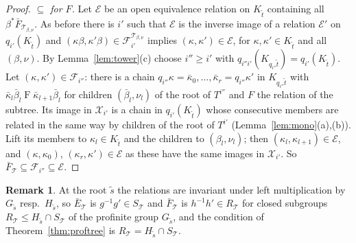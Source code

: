 \documentclass[11pt]{amsart}
\theoremstyle{definition}
\newtheorem{rem}[thm]{Remark}
\newcommand{\cX}{\mathcal X}
\begin{document}
\begin{proof}
\emph{$\subseteq$ for $F$.} Let $\mathcal E$ be an open equivalence
relation on $K_{\tilde t}$ containing all $\beta^*\bar F_{\mathcal T_{\beta,\nu}}$. As before there is $i'$ such that $\mathcal E$ is the
inverse image of a relation $\mathcal E'$ on $q_{i'}(K_{\tilde t})$
and $(\kappa\beta,\kappa'\beta)\in\mathcal F^{\mathcal T_{\beta,\nu}}_{i'}$
implies $(\kappa,\kappa')\in\mathcal E$, for $\kappa,\kappa'\in
K_{\tilde t}$ and all $(\beta,\nu)$. By Lemma~\ref{lem:tower}(c) choose
$i''\ge i'$ with $q_{i''i'}(K_{q_{i''}\tilde t})=q_{i'}(K_{\tilde
t})$. Let $(\kappa,\kappa')\in\mathcal F_{i''}$: there is a chain
$q_{i''}\kappa=\bar\kappa_0,\dots,\bar\kappa_r=q_{i''}\kappa'$ in
$K_{q_{i''}\tilde t}$ with $\bar\kappa_l\bar\beta_l\mathrel{F}
\bar\kappa_{l+1}\bar\beta_l$ for children $(\bar\beta_l,\nu_l)$ of the
root of $T^{i''}$ and $F$ the relation of the subtree. Its image in
$\cX_{i'}$ is a chain in $q_{i'}(K_{\tilde t})$ whose consecutive
members are related in the same way by children of the root of
$T^{i'}$ (Lemma~\ref{lem:mono}(a),(b)). Lift its members to $\kappa_l
\in K_{\tilde t}$ and the children to $(\beta_l,\nu_l)$; then
$(\kappa_l,\kappa_{l+1})\in\mathcal E$, and $(\kappa,\kappa_0)$,
$(\kappa_r,\kappa')\in\mathcal E$ as these have the same images in
$\cX_{i'}$. So $\bar F_{\mathcal T}\subseteq\mathcal F_{i''}\subseteq
\mathcal E$.
\end{proof}

\begin{rem}\label{rem:groups}
At the root $\tilde s$ the relations are invariant under left
multiplication by $G_{\tilde s}$ resp.\ $H_{\tilde s}$, so $\bar
E_{\mathcal T}$ is $g^{-1}g'\in S_{\mathcal T}$ and $\bar F_{\mathcal
T}$ is $h^{-1}h'\in R_{\mathcal T}$ for closed subgroups $R_{\mathcal
T}\le H_{\tilde s}\cap S_{\mathcal T}$ of the profinite group
$G_{\tilde s}$, and the condition of Theorem~\ref{thm:proftree} is
$R_{\mathcal T}=H_{\tilde s}\cap S_{\mathcal T}$.
\end{rem}
\end{document}
